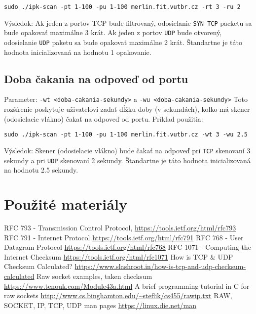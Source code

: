 \documentclass[titlepage]{article}
\begin{document}
\verb|sudo ./ipk-scan -pt 1-100 -pu 1-100 merlin.fit.vutbr.cz -rt 3 -ru 2| \newline

Výsledok: Ak jeden z portov TCP bude filtrovaný, odosielanie \verb|SYN TCP| packetu sa bude opakovať maximálne 3 krát. Ak jeden z portov \verb|UDP| bude otvorený, odosielanie \verb|UDP| paketu sa bude opakovať maximálne 2 krát.
Štandartne je táto hodnota inicializovaná na hodnotu 1 opakovanie.
\subsection{Doba čakania na odpoveď od portu}
Parameter: \verb|-wt <doba-cakania-sekundy>| a \verb|-wu <doba-cakania-sekundy>|\newline \newline
Toto rozšírenie poskytuje uživatelovi zadať dĺžku doby (v sekundách), kolko má skener (odosielacie vlákno) čakať na odpoveď od portu.\newline
Príklad použitia:\newline

\verb|sudo ./ipk-scan -pt 1-100 -pu 1-100 merlin.fit.vutbr.cz -wt 3 -wu 2.5| \newline

Výsledok: Skener (odosielacie vlákno) bude čakať na odpoveď pri \verb|TCP| skenovaní 3 sekundy a pri \verb|UDP| skenovaní 2 sekundy.
Štandartne je táto hodnota inicializovaná na hodnotu 2.5 sekundy.
\cite{rfc793}
\newpage
\section{Použité materiály}
\begin{thebibliography}{999}
	RFC 793 - Transmission Control Protocol,
	\url{https://tools.ietf.org/html/rfc793}
	RFC 791 - Internet Protocol
	\url{https://tools.ietf.org/html/rfc791}
	RFC 768 - User Datagram Protocol
	\url{https://tools.ietf.org/html/rfc768}
	RFC 1071 - Computing the Internet Checksum
	\url{https://tools.ietf.org/html/rfc1071}
	How is TCP & UDP Checksum Calculated?
	\url{https://www.slashroot.in/how-is-tcp-and-udp-checksum-calculated}
	Raw socket examples, taken checksum
	\url{https://www.tenouk.com/Module43a.html}
	A brief programming tutorial in C for raw sockets
	\url{http://www.cs.binghamton.edu/~steflik/cs455/rawip.txt}
	RAW, SOCKET, IP, TCP, UDP man pages
	\url{https://linux.die.net/man}
\end{thebibliography}

\newpage
\end{document}
